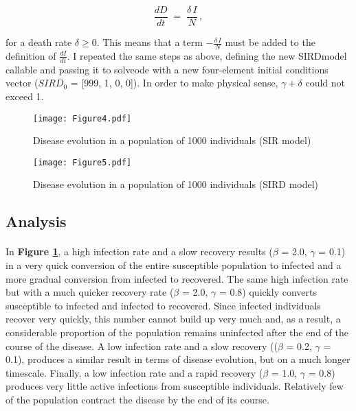 \documentclass{article}
\begin{document}
$$ \frac{dD}{dt} \; = \; \frac{\delta \, I}{N} \, , $$

for a death rate $\delta \geq 0$. This means that a term $- \frac{\delta \, I}{N}$ must be added to the definition of $\frac{dI}{dt}$. I repeated the same steps as above, defining the new SIRDmodel callable and passing it to solveode with a new four-element initial conditions vector ($SIRD_0$ = [999, 1, 0, 0]). In order to make physical sense, $\gamma + \delta$ could not exceed 1.

\begin{figure}[H]
\begin{center}
\texttt{[image: Figure4.pdf]}
\caption{Disease evolution in a population of 1000 individuals (SIR model) \textbf{\label{fig4}}}
\end{center}
\end{figure}

\begin{figure}[H]
\begin{center}
\texttt{[image: Figure5.pdf]}
\caption{Disease evolution in a population of 1000 individuals (SIRD model) \textbf{\label{fig5}}}
\end{center}
\end{figure}


\subsection{Analysis}

\paragraph{}
In \textbf{Figure \ref{fig4}}, a high infection rate and a slow recovery results ($\beta$ = 2.0, $\gamma$ = 0.1) in a very quick conversion of the entire susceptible population to infected and a more gradual conversion from infected to recovered. The same high infection rate but with a much quicker recovery rate ($\beta$ = 2.0, $\gamma$ = 0.8) quickly converts susceptible to infected and infected to recovered. Since infected individuals recover very quickly, this number cannot build up very much and, as a result, a considerable proportion of the population remains uninfected after the end of the course of the disease. A low infection rate and a slow recovery (($\beta$ = 0.2, $\gamma$ = 0.1), produces a similar result in terms of disease evolution, but on a much longer timescale. Finally, a low infection rate and a rapid recovery ($\beta$ = 1.0, $\gamma$ = 0.8) produces very little active infections from susceptible individuals. Relatively few of the population contract the disease by the end of its course.
\end{document}
